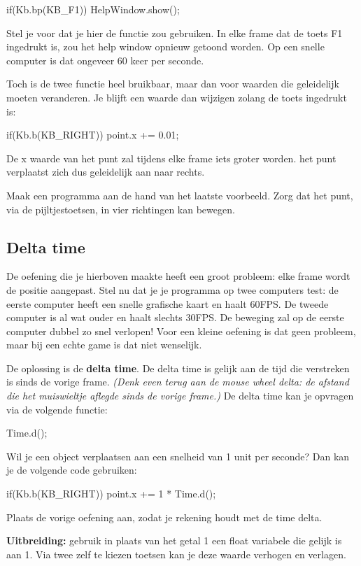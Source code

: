 \begin{code}
if(Kb.bp(KB_F1)) HelpWindow.show();
\end{code}

Stel je voor dat je hier de functie  zou gebruiken. In elke frame dat de toets F1 ingedrukt is, zou het help window opnieuw getoond worden. Op een snelle computer is dat ongeveer 60 keer per seconde. 

Toch is de twee functie heel bruikbaar, maar dan voor waarden die geleidelijk moeten veranderen. Je blijft een waarde dan wijzigen zolang de toets ingedrukt is:

\begin{code}
if(Kb.b(KB_RIGHT)) point.x += 0.01;
\end{code}

De x waarde van het punt zal tijdens elke frame iets groter worden. het punt verplaatst zich dus geleidelijk aan naar rechts.

\begin{exercise}
Maak een programma aan de hand van het laatste voorbeeld. Zorg dat het punt, via de pijltjestoetsen, in vier richtingen kan bewegen.
\end{exercise}

\subsection{Delta time}
De oefening die je hierboven maakte heeft een groot probleem: elke frame wordt de positie aangepast. Stel nu dat je je programma op twee computers test: de eerste computer heeft een snelle grafische kaart en haalt 60FPS. De tweede computer is al wat ouder en haalt slechts 30FPS. De beweging zal op de eerste computer dubbel zo snel verlopen! Voor een kleine oefening is dat geen probleem, maar bij een echte game is dat niet wenselijk.

De oplossing is de \textbf{delta time}. De delta time is gelijk aan de tijd die verstreken is sinds de vorige frame. \textsl{(Denk even terug aan de mouse wheel delta: de afstand die het muiswieltje aflegde sinds de vorige frame.)} De delta time kan je opvragen via de volgende functie:

\begin{code}
Time.d();
\end{code}

Wil je een object verplaatsen aan een snelheid van 1 unit per seconde? Dan kan je de volgende code gebruiken:

\begin{code}
if(Kb.b(KB_RIGHT)) point.x += 1 * Time.d();
\end{code}

\begin{exercise}
Plaats de vorige oefening aan, zodat je rekening houdt met de time delta.

\textbf{Uitbreiding:} gebruik in plaats van het getal 1 een float variabele die gelijk is aan 1. Via twee zelf te kiezen toetsen kan je deze waarde verhogen en verlagen.
\end{exercise}



